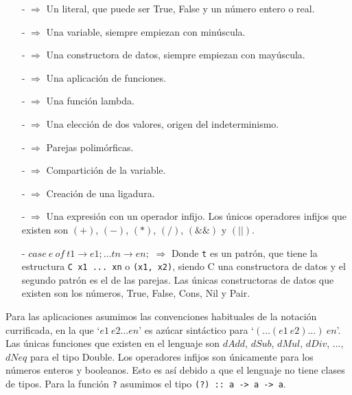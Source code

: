 \documentclass[class=article, crop=false]{standalone}
\begin{document}
\begin{itemize}
  \item[-]{} $\Rightarrow$ Un literal, que puede ser True, False y
  un número entero o real.
  
  \item[-]{} $\Rightarrow$ Una variable, siempre empiezan con
  minúscula.
  
  \item[-]{} $\Rightarrow$ Una constructora de datos, siempre
  empiezan con mayúscula.
  
  \item[-]{} $\Rightarrow$ Una aplicación de funciones.
  \item[-]{} $\Rightarrow$ Una función
  lambda.
  
  \item[-]{}  $\Rightarrow$ Una elección de dos valores,
  origen del indeterminismo.
  
  \item[-]{} $\Rightarrow$ Parejas polimórficas.
  \item[-]{} $\Rightarrow$ Compartición
  de la variable.
  
  \item[-]{} $\Rightarrow$ Creación de una
  ligadura.
  
  \item[-]{} $\Rightarrow$ Una expresión con un
  operador infijo. Los únicos operadores infijos que existen son $(+)$, $(-)$, $(*)$, $(/)$,
  $(\&\&)$ y $(||)$.

  \item[-]$case \: e \: of \: t1 \rightarrow e1 ; \ldots tn \rightarrow en ;$ $\Rightarrow$
  Donde \verb`t` es un patrón, que tiene la estructura \verb`C x1 ... xn` o \verb`(x1, x2)`,
  siendo C una constructora de datos y el segundo patrón es el de las parejas. Las únicas
  constructoras de datos que existen son los números, True, False, Cons, Nil y Pair.
\end{itemize}

Para las aplicaciones asumimos las convenciones habituales de la notación currificada, en la
que `$e1 \: e2 \ldots en$' es azúcar sintáctico para `$(\ldots(e1 \: e2)\ldots) \: en$'. Las
únicas funciones que existen en el lenguaje son $dAdd$, $dSub$, $dMul$, $dDiv$, ..., $dNeq$
para el tipo Double. Los operadores infijos son únicamente para los números enteros y
booleanos. Esto es así debido a que el lenguaje no tiene clases de tipos. Para la función
\verb`?` asumimos el tipo \verb`(?) :: a -> a -> a`.
\end{document}
